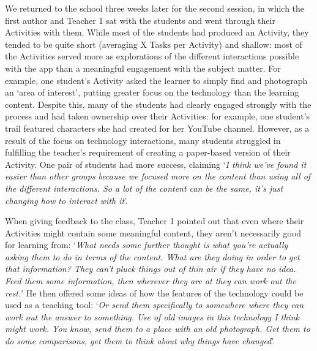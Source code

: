 \documentclass[,hyphens]{sigchi}
\begin{document}
We returned to the school three weeks later for the second session, in which the first author and Teacher 1 sat with the students and went through their Activities with them. While most of the students had produced an Activity, they tended to be quite short (averaging X Tasks per Activity) and shallow: most of the Activities served more as explorations of the different interactions possible with the app than a meaningful engagement with the subject matter. For example, one student's Activity asked the learner to simply find and photograph an `area of interest', putting greater focus on the technology than the learning content. Despite this, many of the students had clearly engaged strongly with the process and had taken ownership over their Activities: for example, one student's trail featured characters she had created for her YouTube channel. However, as a result of the focus on technology interactions, many students struggled in fulfilling the teacher's requirement of creating a paper-based version of their Activity. One pair of students had more success, claiming `\textit{I think we've found it easier than other groups because we focused more on the content than using all of the different interactions. So a lot of the content can be the same, it's just changing how to interact with it}'.

When giving feedback to the class, Teacher 1 pointed out that even where their Activities might contain some meaningful content, they aren't necessarily good for learning from: `\textit{What needs some further thought is what you're actually asking them to do in terms of the content. What are they doing in order to get that information? They can't pluck things out of thin air if they have no idea. Feed them some information, then wherever they are at they can work out the rest.}' He then offered some ideas of how the features of the technology could be used as a teaching tool: `\textit{Or send them specifically to somewhere where they can work out the answer to something. Use of old images in this technology I think might work. You know, send them to a place with an old photograph. Get them to do some comparisons, get them to think about why things have changed}'.
\end{document}
